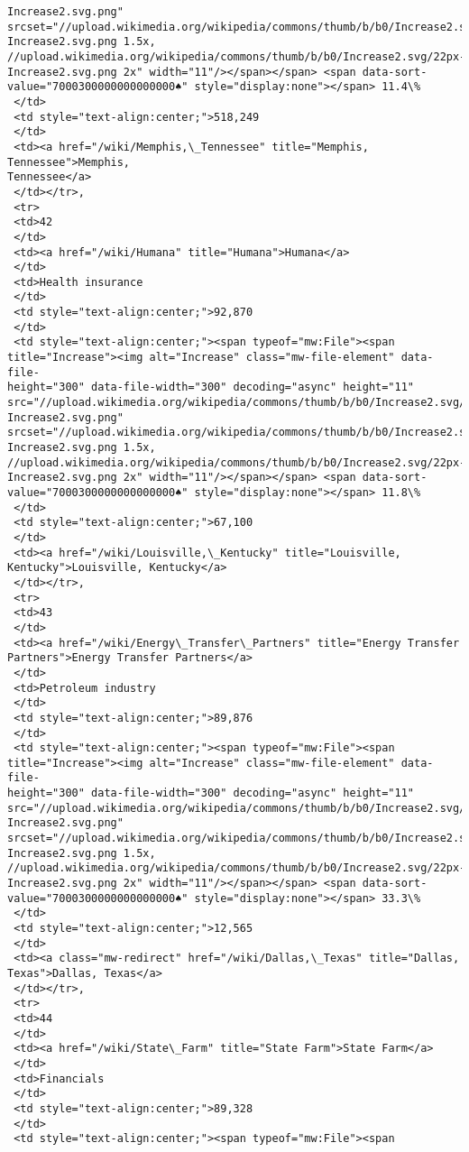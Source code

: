 \documentclass[11pt]{article}
\begin{document}
\begin{tcolorbox}[breakable, size=fbox, boxrule=.5pt, pad at break*=1mm, opacityfill=0]
\begin{Verbatim}[commandchars=\\\{\}]
Increase2.svg.png"
srcset="//upload.wikimedia.org/wikipedia/commons/thumb/b/b0/Increase2.svg/17px-
Increase2.svg.png 1.5x,
//upload.wikimedia.org/wikipedia/commons/thumb/b/b0/Increase2.svg/22px-
Increase2.svg.png 2x" width="11"/></span></span> <span data-sort-
value="7000300000000000000♠" style="display:none"></span> 11.4\%
 </td>
 <td style="text-align:center;">518,249
 </td>
 <td><a href="/wiki/Memphis,\_Tennessee" title="Memphis, Tennessee">Memphis,
Tennessee</a>
 </td></tr>,
 <tr>
 <td>42
 </td>
 <td><a href="/wiki/Humana" title="Humana">Humana</a>
 </td>
 <td>Health insurance
 </td>
 <td style="text-align:center;">92,870
 </td>
 <td style="text-align:center;"><span typeof="mw:File"><span
title="Increase"><img alt="Increase" class="mw-file-element" data-file-
height="300" data-file-width="300" decoding="async" height="11"
src="//upload.wikimedia.org/wikipedia/commons/thumb/b/b0/Increase2.svg/11px-
Increase2.svg.png"
srcset="//upload.wikimedia.org/wikipedia/commons/thumb/b/b0/Increase2.svg/17px-
Increase2.svg.png 1.5x,
//upload.wikimedia.org/wikipedia/commons/thumb/b/b0/Increase2.svg/22px-
Increase2.svg.png 2x" width="11"/></span></span> <span data-sort-
value="7000300000000000000♠" style="display:none"></span> 11.8\%
 </td>
 <td style="text-align:center;">67,100
 </td>
 <td><a href="/wiki/Louisville,\_Kentucky" title="Louisville,
Kentucky">Louisville, Kentucky</a>
 </td></tr>,
 <tr>
 <td>43
 </td>
 <td><a href="/wiki/Energy\_Transfer\_Partners" title="Energy Transfer
Partners">Energy Transfer Partners</a>
 </td>
 <td>Petroleum industry
 </td>
 <td style="text-align:center;">89,876
 </td>
 <td style="text-align:center;"><span typeof="mw:File"><span
title="Increase"><img alt="Increase" class="mw-file-element" data-file-
height="300" data-file-width="300" decoding="async" height="11"
src="//upload.wikimedia.org/wikipedia/commons/thumb/b/b0/Increase2.svg/11px-
Increase2.svg.png"
srcset="//upload.wikimedia.org/wikipedia/commons/thumb/b/b0/Increase2.svg/17px-
Increase2.svg.png 1.5x,
//upload.wikimedia.org/wikipedia/commons/thumb/b/b0/Increase2.svg/22px-
Increase2.svg.png 2x" width="11"/></span></span> <span data-sort-
value="7000300000000000000♠" style="display:none"></span> 33.3\%
 </td>
 <td style="text-align:center;">12,565
 </td>
 <td><a class="mw-redirect" href="/wiki/Dallas,\_Texas" title="Dallas,
Texas">Dallas, Texas</a>
 </td></tr>,
 <tr>
 <td>44
 </td>
 <td><a href="/wiki/State\_Farm" title="State Farm">State Farm</a>
 </td>
 <td>Financials
 </td>
 <td style="text-align:center;">89,328
 </td>
 <td style="text-align:center;"><span typeof="mw:File"><span

\end{Verbatim}
\end{tcolorbox}
\end{document}
